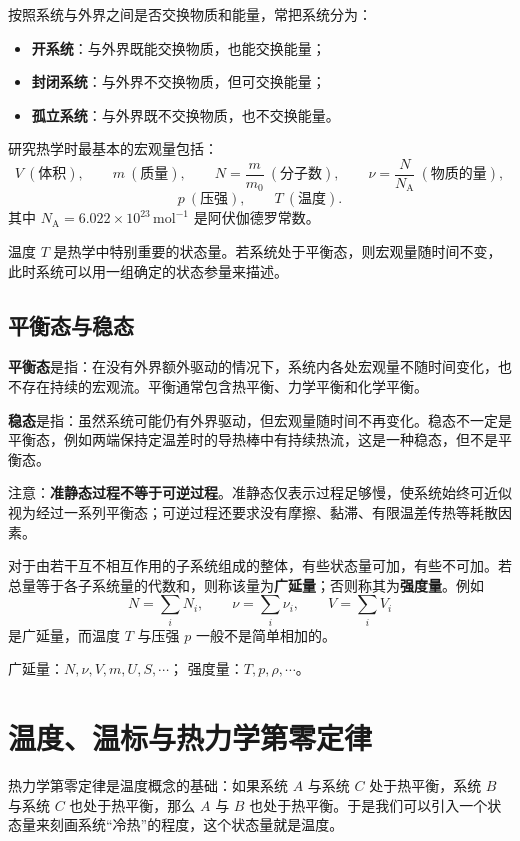 \documentclass[11pt,a4paper,openany]{ctexbook}
\newcommand{\NA}{N_{\mathrm A}}
\begin{document}
按照系统与外界之间是否交换物质和能量，常把系统分为：
\begin{itemize}[leftmargin=2.2em]
\item \textbf{开系统}：与外界既能交换物质，也能交换能量；
\item \textbf{封闭系统}：与外界不交换物质，但可交换能量；
\item \textbf{孤立系统}：与外界既不交换物质，也不交换能量。
\end{itemize}

研究热学时最基本的宏观量包括：
\[
V\ (\text{体积}),\qquad m\ (\text{质量}),\qquad 
N=\frac{m}{m_0}\ (\text{分子数}),\qquad
\nu=\frac{N}{\NA}\ (\text{物质的量}),
\]
\[
p\ (\text{压强}),\qquad T\ (\text{温度}).
\]
其中 $\NA=6.022\times10^{23}\,\mathrm{mol^{-1}}$ 是阿伏伽德罗常数。

温度 $T$ 是热学中特别重要的状态量。若系统处于平衡态，则宏观量随时间不变，此时系统可以用一组确定的状态参量来描述。

\subsection*{平衡态与稳态}
\textbf{平衡态}是指：在没有外界额外驱动的情况下，系统内各处宏观量不随时间变化，也不存在持续的宏观流。平衡通常包含热平衡、力学平衡和化学平衡。

\textbf{稳态}是指：虽然系统可能仍有外界驱动，但宏观量随时间不再变化。稳态不一定是平衡态，例如两端保持定温差时的导热棒中有持续热流，这是一种稳态，但不是平衡态。

\begin{notebox}
注意：\textbf{准静态过程不等于可逆过程}。准静态仅表示过程足够慢，使系统始终可近似视为经过一系列平衡态；可逆过程还要求没有摩擦、黏滞、有限温差传热等耗散因素。
\end{notebox}

对于由若干互不相互作用的子系统组成的整体，有些状态量可加，有些不可加。若总量等于各子系统量的代数和，则称该量为\textbf{广延量}；否则称其为\textbf{强度量}。例如
\[
N=\sum_i N_i,\qquad \nu=\sum_i \nu_i,\qquad V=\sum_i V_i
\]
是广延量，而温度 $T$ 与压强 $p$ 一般不是简单相加的。

\begin{keybox}
广延量：$N,\nu,V,m,U,S,\cdots$；\qquad
强度量：$T,p,\rho,\cdots$。
\end{keybox}

\section{温度、温标与热力学第零定律}
热力学第零定律是温度概念的基础：如果系统 $A$ 与系统 $C$ 处于热平衡，系统 $B$ 与系统 $C$ 也处于热平衡，那么 $A$ 与 $B$ 也处于热平衡。于是我们可以引入一个状态量来刻画系统“冷热”的程度，这个状态量就是温度。
\end{document}
